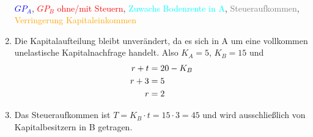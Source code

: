 \documentclass{article}
\begin{document}
\begin{enumerate}[label=(\alph*)]
\begin{center}
 \\
			\textcolor{blue}{$GP_A$}, \textcolor{red}{$GP_B$ ohne/mit Steuern}, \textcolor{cyan}{Zuwachs Bodenrente in A}, \textcolor{gray}{Steueraufkommen}, \textcolor{orange}{Verringerung Kapitaleinkommen}
		\end{center}
		\item Die Kapitalaufteilung bleibt unverändert, da es sich in A um eine vollkommen unelastische Kapitalnachfrage handelt. Also $K_A=5$, $K_B=15$ und
		\begin{align}
			r + t &= 20-K_B \notag \\
			r+3 &= 5 \notag \\
			r &= 2 \notag
		\end{align}
		\item Das Steueraufkommen ist $T=K_B\cdot t=15\cdot 3=45$ und wird ausschließlich von Kapitalbesitzern in B getragen.
	\end{enumerate}
	
\end{document}
